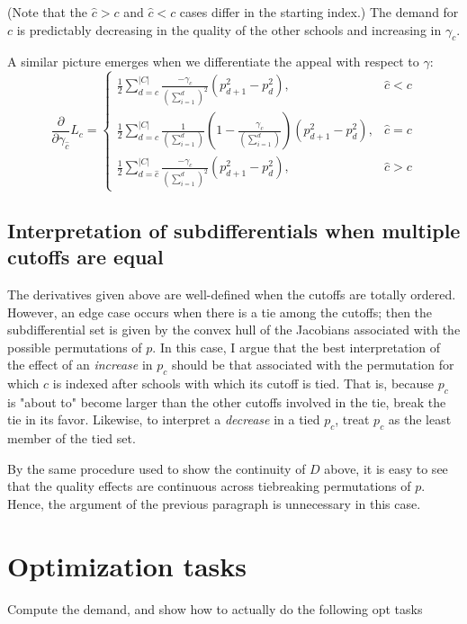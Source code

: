 \documentclass[12pt]{article}
\theoremstyle{definition}
\begin{document}
(Note that the $\hat c > c$ and $ \hat c < c$ cases differ in the starting index.) The demand for $c$ is predictably decreasing in the quality of the other schools and increasing in $\gamma_c$. 

A similar picture emerges when we differentiate the appeal with respect to $\gamma$:
\[\frac{\partial}{\partial\gamma_{\hat c}} L_c = \begin{cases}
\frac{1}{2}\sum_{d=c}^{|C|} \frac{-\gamma_c}{\left(\sum_{i=1}^{d} \right)^2} \left(p_{d+1}^2 - p_d^2 \right), & \hat c < c \\
\frac{1}{2}\sum_{d=c}^{|C|} \frac{1}{\left(\sum_{i=1}^{d} \right)}
    \left( 1 - \frac{\gamma_c}{\left(\sum_{i=1}^{d} \right)}\right)
    \left(p_{d+1}^2 - p_d^2 \right), & \hat c = c\\
\frac{1}{2}\sum_{d=\hat c}^{|C|} \frac{-\gamma_c}{\left(\sum_{i=1}^{d} \right)^2} \left(p_{d+1}^2 - p_d^2 \right), & \hat c > c
\end{cases}\]

\subsection{Interpretation of subdifferentials when multiple cutoffs are equal}
The derivatives given above are well-defined when the cutoffs are totally ordered. However, an edge case occurs when there is a tie among the cutoffs; then the subdifferential set is given by the convex hull of the Jacobians associated with the possible permutations of $p$. In this case, I argue that the best interpretation of the effect of an \emph{increase} in $p_c$ should be that associated with the permutation for which $c$ is indexed after schools with which its cutoff is tied. That is, because $p_c$ is "about to" become larger than the other cutoffs involved in the tie, break the tie in its favor. Likewise, to interpret a \emph{decrease} in a tied $p_c$, treat $p_c$ as the least member of the tied set.

By the same procedure used to show the continuity of $D$ above, it is easy to see that the quality effects are continuous across tiebreaking permutations of $p$. Hence, the argument of the previous paragraph is unnecessary in this case.






\section{Optimization tasks}
Compute the demand, and show how to actually do the following opt tasks 
\end{document}
